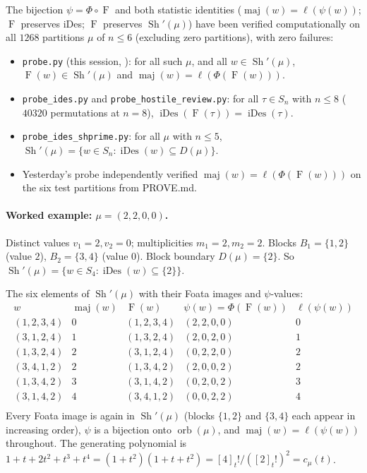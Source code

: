 \documentclass[11pt]{article}
\theoremstyle{definition}
\DeclareMathOperator{\Sh}{Sh}
\DeclareMathOperator{\orb}{orb}
\DeclareMathOperator{\maj}{maj}
\DeclareMathOperator{\iDes}{iDes}
\newcommand{\Foata}{\operatorname{F}}
\newcommand{\Phimap}{\Phi}
\begin{document}
The bijection $\psi = \Phimap \circ \Foata$ and both statistic identities
($\maj(w) = \ell(\psi(w))$; $\Foata$ preserves iDes; $\Foata$ preserves
$\Sh'(\mu)$) have been verified computationally on all $1268$ partitions
$\mu$ of $n \le 6$ (excluding zero partitions), with zero failures:
\begin{itemize}
\item \texttt{probe.py} (this session, ):
      for all such $\mu$, and all $w \in \Sh'(\mu)$, $\Foata(w) \in \Sh'(\mu)$
      and $\maj(w) = \ell(\Phimap(\Foata(w)))$.
\item \texttt{probe\_ides.py} and \texttt{probe\_hostile\_review.py}: for all
      $\tau \in S_n$ with $n \le 8$ ($40320$ permutations at $n=8$),
      $\iDes(\Foata(\tau)) = \iDes(\tau)$.
\item \texttt{probe\_ides\_shprime.py}: for all $\mu$ with $n \le 5$,
      $\Sh'(\mu) = \{w \in S_n : \iDes(w) \subseteq D(\mu)\}$.
\item Yesterday's probe 
      independently verified $\maj(w) = \ell(\Phimap(\Foata(w)))$ on the six
      test partitions from PROVE.md.
\end{itemize}

\paragraph{Worked example: $\mu = (2,2,0,0)$.}
Distinct values $v_1 = 2, v_2 = 0$; multiplicities $m_1 = 2, m_2 = 2$.
Blocks $B_1 = \{1, 2\}$ (value $2$), $B_2 = \{3, 4\}$ (value $0$).  Block
boundary $D(\mu) = \{2\}$.  So $\Sh'(\mu) = \{w \in S_4 : \iDes(w) \subseteq
\{2\}\}$.

The six elements of $\Sh'(\mu)$ with their Foata images and $\psi$-values:
\[
\begin{array}{c|c|c|c|c}
 w & \maj(w) & \Foata(w) & \psi(w) = \Phimap(\Foata(w)) & \ell(\psi(w)) \\ \hline
 (1,2,3,4) & 0 & (1,2,3,4) & (2,2,0,0) & 0 \\
 (3,1,2,4) & 1 & (1,3,2,4) & (2,0,2,0) & 1 \\
 (1,3,2,4) & 2 & (3,1,2,4) & (0,2,2,0) & 2 \\
 (3,4,1,2) & 2 & (1,3,4,2) & (2,0,0,2) & 2 \\
 (1,3,4,2) & 3 & (3,1,4,2) & (0,2,0,2) & 3 \\
 (3,1,4,2) & 4 & (3,4,1,2) & (0,0,2,2) & 4 \\
\end{array}
\]
Every Foata image is again in $\Sh'(\mu)$ (blocks $\{1,2\}$ and $\{3,4\}$ each
appear in increasing order), $\psi$ is a bijection onto $\orb(\mu)$, and
$\maj(w) = \ell(\psi(w))$ throughout.  The generating polynomial is
$1 + t + 2t^2 + t^3 + t^4 = (1+t^2)(1+t+t^2) = [4]_t!/([2]_t!)^2 = c_\mu(t)$.
\end{document}
